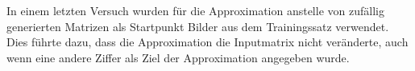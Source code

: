 \documentclass[Interploate_hadwritten_Digits.tex]{subfiles}
\begin{document}
	In einem letzten Versuch wurden für die Approximation anstelle von zufällig generierten Matrizen als Startpunkt Bilder aus dem Trainingssatz verwendet. Dies führte dazu, dass die Approximation die Inputmatrix nicht veränderte, auch wenn eine andere Ziffer als Ziel der Approximation angegeben wurde.
\end{document}
